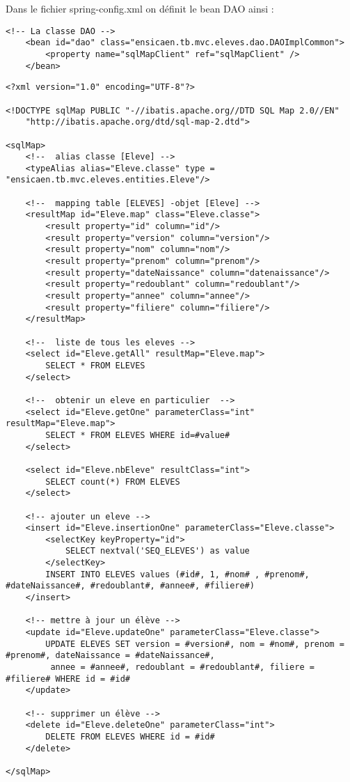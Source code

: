 \documentclass[a4paper,12pt]{article}
\begin{document}
Dans le fichier spring-config.xml on définit le bean DAO ainsi :

\begin{lstlisting}
<!-- La classe DAO -->
	<bean id="dao" class="ensicaen.tb.mvc.eleves.dao.DAOImplCommon">
		<property name="sqlMapClient" ref="sqlMapClient" />
	</bean>
\end{lstlisting}




\begin{lstlisting}
<?xml version="1.0" encoding="UTF-8"?>

<!DOCTYPE sqlMap PUBLIC "-//ibatis.apache.org//DTD SQL Map 2.0//EN"
	"http://ibatis.apache.org/dtd/sql-map-2.dtd">
	
<sqlMap>
	<!--  alias classe [Eleve] -->
	<typeAlias alias="Eleve.classe" type = "ensicaen.tb.mvc.eleves.entities.Eleve"/>
	
	<!--  mapping table [ELEVES] -objet [Eleve] -->
	<resultMap id="Eleve.map" class="Eleve.classe">
		<result property="id" column="id"/>
		<result property="version" column="version"/>
		<result property="nom" column="nom"/>
		<result property="prenom" column="prenom"/>
		<result property="dateNaissance" column="datenaissance"/>
		<result property="redoublant" column="redoublant"/>
		<result property="annee" column="annee"/>
		<result property="filiere" column="filiere"/>		
	</resultMap>
	
	<!--  liste de tous les eleves -->
	<select id="Eleve.getAll" resultMap="Eleve.map">
		SELECT * FROM ELEVES
	</select>
	
	<!--  obtenir un eleve en particulier  -->
	<select id="Eleve.getOne" parameterClass="int" resultMap="Eleve.map">
		SELECT * FROM ELEVES WHERE id=#value#
	</select>
	
	<select id="Eleve.nbEleve" resultClass="int">
		SELECT count(*) FROM ELEVES
	</select>
	
	<!-- ajouter un eleve -->
	<insert id="Eleve.insertionOne" parameterClass="Eleve.classe">
		<selectKey keyProperty="id">
			SELECT nextval('SEQ_ELEVES') as value
		</selectKey>
		INSERT INTO ELEVES values (#id#, 1, #nom# , #prenom#, #dateNaissance#, #redoublant#, #annee#, #filiere#)
	</insert>
	
	<!-- mettre à jour un élève -->
	<update id="Eleve.updateOne" parameterClass="Eleve.classe">
		UPDATE ELEVES SET version = #version#, nom = #nom#, prenom = #prenom#, dateNaissance = #dateNaissance#,
		 annee = #annee#, redoublant = #redoublant#, filiere = #filiere# WHERE id = #id#
	</update>
	
	<!-- supprimer un élève -->
	<delete id="Eleve.deleteOne" parameterClass="int">
		DELETE FROM ELEVES WHERE id = #id#
	</delete>

</sqlMap>
\end{lstlisting}
\end{document}
